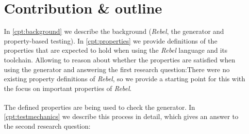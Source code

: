 \section{Contribution \& outline}
In \autoref{cpt:background} we describe the background (\textit{Rebel}, the
generator and property-based testing).
In \autoref{cpt:properties} we provide definitions of the properties that are
expected to hold when using the \textit{Rebel} language and its toolchain.
Allowing to reason about whether the properties are satisfied when using the
generator and answering the first research question:\rqOne There were
no existing property definitions of \textit{Rebel}, so we provide a starting
point for this with the focus on important properties of \textit{Rebel}.\\
\\
The defined properties are being used to check the generator. In
\autoref{cpt:testmechanics} we describe this process in detail, which gives an
answer to the second research question:\rqTwo\\
\\
